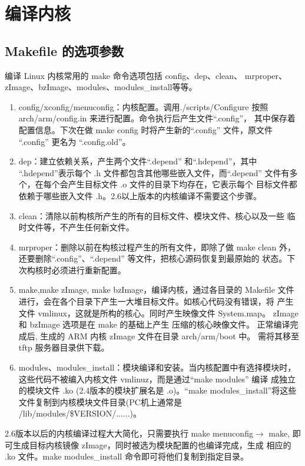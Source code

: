\section{编译内核}
\subsection{Makefile 的选项参数}
	编译 Linux 内核常用的 make 命令选项包括 config、dep、clean、
mrproper、zImage、bzImage、modules、modules\_install等等。
\begin{enumerate}\itemsep=-3pt
  \item config/xconfig/menuconfig：内核配置。调用./scripts/Configure 按照
		arch/arm/config.in 来进行配置。命令执行后产生文件``.config''，
		其中保存着配置信息。下次在做 make config 时将产生新的``.config''
		文件，原文件 ``.config'' 更名为 ``.config.old''。
  \item dep：建立依赖关系，产生两个文件``.depend'' 和``.hdepend''，其中
		``.hdepend''表示每个 .h 文件都包含其他哪些嵌入文件，而``.depend''
		文件有多个，在每个会产生目标文件 .o 文件的目录下均存在，它表示每个
		目标文件都依赖于哪些嵌入文件 .h。2.6以上版本的内核编译不需要这个步骤。
  \item clean：清除以前构核所产生的所有的目标文件、模块文件、核心以及一些
		临时文件等，不产生任何新文件。
  \item mrproper：删除以前在构核过程产生的所有文件，即除了做 make clean 外，
		还要删除``.config''、``.depend'' 等文件，把核心源码恢复到最原始的
		状态。下次构核时必须进行重新配置。
  \item make,make zImage, make bzImage，编译内核，通过各目录的 Makefile
		文件进行，会在各个目录下产生一大堆目标文件。如核心代码没有错误，将
		产生文件 vmlinux，这就是所构的核心。同时产生映像文件 System.map。
		zImage 和 bzImage 选项是在 make 的基础上产生 压缩的核心映像文件。
		正常编译完成后, 生成的 ARM 内核 zImage 文件在目录 arch/arm/boot 中。
		需将其移至 tftp 服务器目录供下载。
  \item modules、modules\_install：模块编译和安装。当内核配置中有选择模块时，
		这些代码不被编入内核文件 vmlinuz，而是通过``make modules'' 编译
		成独立的模块文件 .ko (2.4版本的模块扩展名是 .o)。``make
		modules\_install''将这些文件复制到内核模块文件目录(PC机上通常是
		/lib/modules/\$VERSION/......)。
\end{enumerate}

	2.6版本以后的内核编译过程大大简化，只需要执行 make menuconfig$\to$
make, 即可生成目标内核镜像 zImage，同时被选为模块配置的也编译完成，生成
相应的 .ko 文件。make modules\_install 命令即可将他们复制到指定目录。

